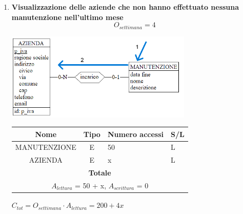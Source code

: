 \documentclass[12pt,a4paper]{report}
\begin{document}
\begin{enumerate}[label=\textbf{\arabic*)}]
	\item \textbf{Visualizzazione delle aziende che non hanno effettuato nessuna manutenzione nell’ultimo mese} \label{op17} \\
    \[ {O_{settimana} = 4} \]
    \begin{center}
	\includegraphics[width=0.7\textwidth]{op_17}
	\end{center}
    \begin{table}[H]
    \centering
    \begin{tabular}{|c|c|l|l|}
    \hline
    \textbf{Nome} & \textbf{Tipo} & \textbf{Numero accessi} & \textbf{S/L} \\
    \hline
    MANUTENZIONE & E & 50 & L \\
    \hline
    AZIENDA & E & x & L \\
    \hline
    \multicolumn{4}{c}{\textbf{Totale}} \\
    \multicolumn{4}{c}{${A_{lettura}}$ = 50 + x, ${A_{scrittura}}$ = 0} \\
    \hline
    \end{tabular}
    \end{table}
    \begin{center}
    ${C_{tot} = {O_{settimana}}\cdot {A_{lettura}} = 200 + 4x}$
    \end{center}



\end{enumerate}
\end{document}
